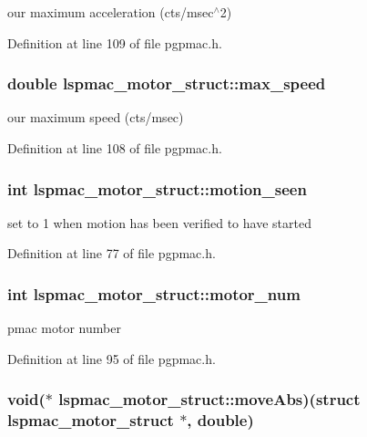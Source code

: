 our maximum acceleration (cts/msec$^\wedge$2) 

Definition at line 109 of file pgpmac.h.\hypertarget{structlspmac__motor__struct_af27159eeef80e4438446e01f24fae9d5}{
\subsubsection[{max\_\-speed}]{\setlength{\rightskip}{0pt plus 5cm}double {\bf lspmac\_\-motor\_\-struct::max\_\-speed}}}
\label{structlspmac__motor__struct_af27159eeef80e4438446e01f24fae9d5}


our maximum speed (cts/msec) 

Definition at line 108 of file pgpmac.h.\hypertarget{structlspmac__motor__struct_a68c471836f52707fa8582f7860cf500f}{
\subsubsection[{motion\_\-seen}]{\setlength{\rightskip}{0pt plus 5cm}int {\bf lspmac\_\-motor\_\-struct::motion\_\-seen}}}
\label{structlspmac__motor__struct_a68c471836f52707fa8582f7860cf500f}


set to 1 when motion has been verified to have started 

Definition at line 77 of file pgpmac.h.\hypertarget{structlspmac__motor__struct_a45fae17618f0c0827e97060dc04f79cb}{
\subsubsection[{motor\_\-num}]{\setlength{\rightskip}{0pt plus 5cm}int {\bf lspmac\_\-motor\_\-struct::motor\_\-num}}}
\label{structlspmac__motor__struct_a45fae17618f0c0827e97060dc04f79cb}


pmac motor number 

Definition at line 95 of file pgpmac.h.\hypertarget{structlspmac__motor__struct_a20db3de86854b627815b3d940555ea75}{
\subsubsection[{moveAbs}]{\setlength{\rightskip}{0pt plus 5cm}void($\ast$ {\bf lspmac\_\-motor\_\-struct::moveAbs})(struct {\bf lspmac\_\-motor\_\-struct} $\ast$, double)}}
\label{structlspmac__motor__struct_a20db3de86854b627815b3d940555ea75}



